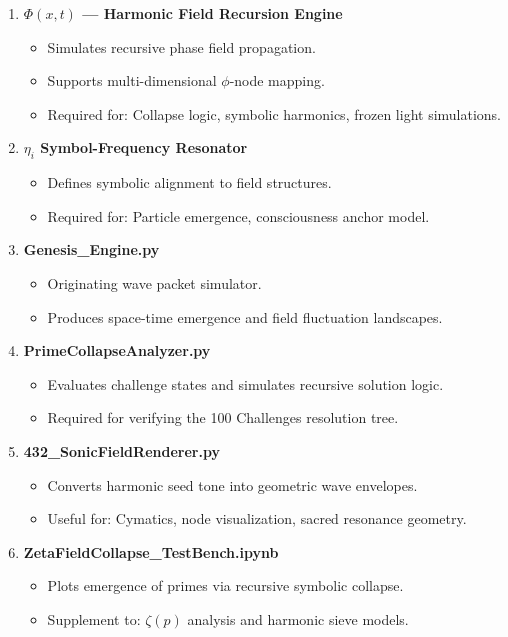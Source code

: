 \documentclass[12pt]{article}
\begin{document}
\begin{enumerate}
  \item \textbf{$\Phi(x,t)$ — Harmonic Field Recursion Engine}
    \begin{itemize}
      \item Simulates recursive phase field propagation.
      \item Supports multi-dimensional $\phi$-node mapping.
      \item Required for: Collapse logic, symbolic harmonics, frozen light simulations.
    \end{itemize}

  \item \textbf{$\eta_i$ Symbol-Frequency Resonator}
    \begin{itemize}
      \item Defines symbolic alignment to field structures.
      \item Required for: Particle emergence, consciousness anchor model.
    \end{itemize}

  \item \textbf{Genesis\_Engine.py}
    \begin{itemize}
      \item Originating wave packet simulator.
      \item Produces space-time emergence and field fluctuation landscapes.
    \end{itemize}

  \item \textbf{PrimeCollapseAnalyzer.py}
    \begin{itemize}
      \item Evaluates challenge states and simulates recursive solution logic.
      \item Required for verifying the 100 Challenges resolution tree.
    \end{itemize}

  \item \textbf{432\_SonicFieldRenderer.py}
    \begin{itemize}
      \item Converts harmonic seed tone into geometric wave envelopes.
      \item Useful for: Cymatics, node visualization, sacred resonance geometry.
    \end{itemize}

  \item \textbf{ZetaFieldCollapse\_TestBench.ipynb}
    \begin{itemize}
      \item Plots emergence of primes via recursive symbolic collapse.
      \item Supplement to: $\zeta(p)$ analysis and harmonic sieve models.
    \end{itemize}
\end{enumerate}
\end{document}
